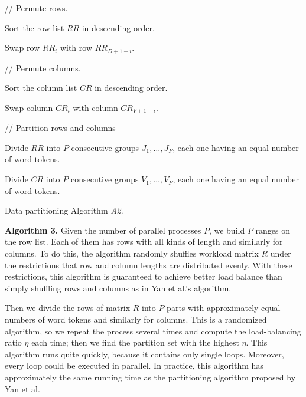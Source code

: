 \documentclass[10pt,conference]{IEEEtran}
\begin{document}
\begin{algorithm} [h]


\nonl// Permute rows.

Sort the row list $RR$ in descending order.

 {
	 {
		Swap row $RR_i$ with row $RR_{D+1-i}$.
	}
}
	
\nonl// Permute columns.

Sort the column list $CR$ in descending order.

 {
	 {
		Swap column $CR_i$ with column $CR_{V+1-i}$.
	}
}

\nonl// Partition rows and columns

Divide $RR$ into $P$ consecutive groups $J_1, \ldots, J_P$, each one having an equal number of word tokens.

Divide $CR$ into $P$ consecutive groups $V_1, \ldots, V_P$, each one having an equal number of word tokens.

\caption{Data partitioning Algorithm \textit{A2}.}
\label{A2}
\end{algorithm}

\textbf{Algorithm 3.} Given the number of parallel processes $P$, we build $P$ ranges on the row list. Each of them has rows with all kinds of length and similarly for columns. To do this, the algorithm randomly shuffles workload matrix $R$ under the restrictions that row and column lengths are distributed evenly. With these restrictions, this algorithm is guaranteed to achieve better load balance than simply shuffling rows and columns as in Yan et al.'s algorithm.

Then we divide the rows of matrix $R$ into $P$ parts with approximately equal numbers of word tokens and similarly for columns. This is a randomized algorithm, so we repeat the process several times and compute the load-balancing ratio $\eta$ each time; then we find the partition set with the highest $\eta$. This algorithm runs quite quickly, because it contains only single loops. Moreover, every loop could be executed in parallel. In practice, this algorithm has approximately the same running time as the partitioning algorithm proposed by Yan et al.
\end{document}
